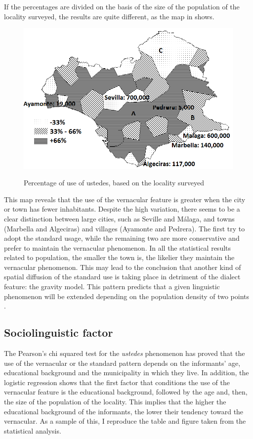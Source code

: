 \documentclass[output=paper]{LSP/langsci}
\begin{document}
If the percentages are divided on the basis of the size of the population of the locality surveyed, the results are quite different, as the map in  shows.

\begin{figure}
\includegraphics[width=\textwidth]{illustrations/lara_fig4}
\label{fig:4}
\caption{Percentage of use of ustedes, based on the locality surveyed}
\end{figure}
  
This map reveals that the use of the vernacular feature is greater when the city or town has fewer inhabitants. Despite the high variation, there seems to be a clear distinction between large cities, such as Seville and Málaga, and towns (Marbella and Algeciras) and villages (Ayamonte and Pedrera). The first try to adopt the standard usage, while the remaining two are more conservative and prefer to maintain the vernacular phenomenon. In all the statistical results related to population, the smaller the town is, the likelier they maintain the vernacular phenomenon. This may lead to the conclusion that another kind of spatial diffusion of the standard use is taking place in detriment of the dialect feature: the gravity model. This pattern predicts that a given linguistic phenomenon will be extended depending on the population density of two points \citep{wolfram_dialectology_2003}.

\subsection{Sociolinguistic factor}
The Pearson’s chi squared test for the \textit{ustedes} phenomenon has proved that the use of the vernacular or the standard pattern depends on the informants’ age, educational background and the municipality in which they live. In addition, the logistic regression shows that the first factor that conditions the use of the vernacular feature is the educational background, followed by the age and, then, the size of the population of the locality. This implies that the higher the educational background of the informants, the lower their tendency toward the vernacular. As a sample of this, I reproduce the table and figure taken from the statistical analysis.
\end{document}
